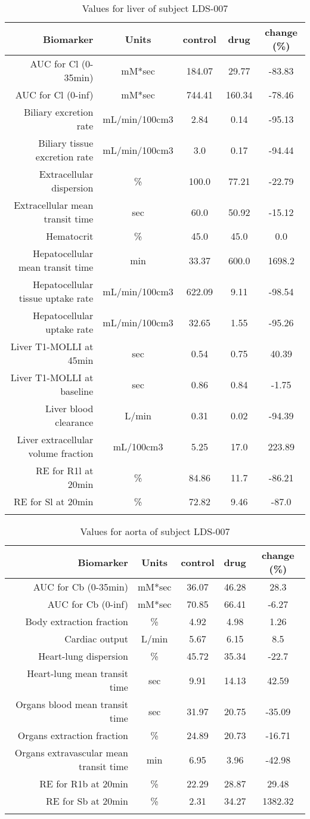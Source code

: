 \documentclass{epflreport}%
\begin{document}
%
\clearpage%
\begin{longtable}{rcccc}%
\hline%
Biomarker&Units&control&drug&change (\%)\\%
\hline%
AUC for Cl (0{-}35min)&mM*sec&184.07&29.77&{-}83.83\\%
AUC for Cl (0{-}inf)&mM*sec&744.41&160.34&{-}78.46\\%
Biliary excretion rate&mL/min/100cm3&2.84&0.14&{-}95.13\\%
Biliary tissue excretion rate&mL/min/100cm3&3.0&0.17&{-}94.44\\%
Extracellular dispersion&\%&100.0&77.21&{-}22.79\\%
Extracellular mean transit time&sec&60.0&50.92&{-}15.12\\%
Hematocrit&\%&45.0&45.0&0.0\\%
Hepatocellular mean transit time&min&33.37&600.0&1698.2\\%
Hepatocellular tissue uptake rate&mL/min/100cm3&622.09&9.11&{-}98.54\\%
Hepatocellular uptake rate&mL/min/100cm3&32.65&1.55&{-}95.26\\%
Liver T1{-}MOLLI at 45min&sec&0.54&0.75&40.39\\%
Liver T1{-}MOLLI at baseline&sec&0.86&0.84&{-}1.75\\%
Liver blood clearance&L/min&0.31&0.02&{-}94.39\\%
Liver extracellular volume fraction&mL/100cm3&5.25&17.0&223.89\\%
RE for R1l at 20min&\%&84.86&11.7&{-}86.21\\%
RE for Sl at 20min&\%&72.82&9.46&{-}87.0\\%
\hline%
\caption{Values for liver of subject LDS-007} \\%
\end{longtable}%
\begin{longtable}{rcccc}%
\hline%
Biomarker&Units&control&drug&change (\%)\\%
\hline%
AUC for Cb (0{-}35min)&mM*sec&36.07&46.28&28.3\\%
AUC for Cb (0{-}inf)&mM*sec&70.85&66.41&{-}6.27\\%
Body extraction fraction&\%&4.92&4.98&1.26\\%
Cardiac output&L/min&5.67&6.15&8.5\\%
Heart{-}lung dispersion&\%&45.72&35.34&{-}22.7\\%
Heart{-}lung mean transit time&sec&9.91&14.13&42.59\\%
Organs blood mean transit time&sec&31.97&20.75&{-}35.09\\%
Organs extraction fraction&\%&24.89&20.73&{-}16.71\\%
Organs extravascular mean transit time&min&6.95&3.96&{-}42.98\\%
RE for R1b at 20min&\%&22.29&28.87&29.48\\%
RE for Sb at 20min&\%&2.31&34.27&1382.32\\%
\hline%
\caption{Values for aorta of subject LDS-007} \\%
\end{longtable}%
\clearpage%
\end{document}
